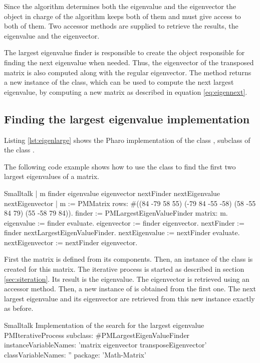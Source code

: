 Since the algorithm determines both the eigenvalue and the
eigenvector the object in charge of the algorithm keeps both of
them and must give access to both of them.
Two accessor methods are supplied to retrieve the results, the eigenvalue and the
eigenvector.

The largest eigenvalue finder is responsible to create the object
responsible for finding the next eigenvalue when needed.
Thus, the eigenvector of the transposed matrix is also computed along with
the regular eigenvector.
The method  returns a new instance of the class, which can be used to compute the next largest eigenvalue, by computing a new matrix as described in equation
\ref{eq:eigennext}.

\subsection{Finding the largest eigenvalue implementation}
Listing \ref{lst:eigenlarge} shows the Pharo implementation of the class , subclass of the class .

The following code example shows how to use the class to find the
first two largest eigenvalues of a matrix.
\begin{displaycode}{Smalltalk}
 | m finder eigenvalue eigenvector nextFinder nextEigenvalue nextEigenvector |
 m := PMMatrix rows: #((84 -79 58 55)
                       (-79 84 -55 -58)
                       (58 -55 84 79)
                       (55 -58 79 84)).
 finder := PMLargestEigenValueFinder matrix: m.
 eigenvalue := finder evaluate.
 eigenvector := finder eigenvector.
 nextFinder := finder nextLargestEigenValueFinder.
 nextEigenvalue := nextFinder evaluate.
 nextEigenvector := nextFinder eigenvector.
\end{displaycode}
First the matrix  is defined from its components. Then, an
instance of the class  is created
for this matrix. The iterative process is started as described in
section \ref{sec:siteration}. Its result is the eigenvalue. The
eigenvector is retrieved using an accessor method. Then, a new
instance of  is obtained from the
first one. The next largest eigenvalue and its eigenvector are
retrieved from this new instance exactly as before.

\begin{listing}[label=lst:eigenlarge]{Smalltalk}
{Implementation of the search for the largest eigenvalue}
PMIterativeProcess subclass: #PMLargestEigenValueFinder
   instanceVariableNames: 'matrix eigenvector transposeEigenvector'
   classVariableNames: ''
   package: 'Math-Matrix'
\end{listing}

